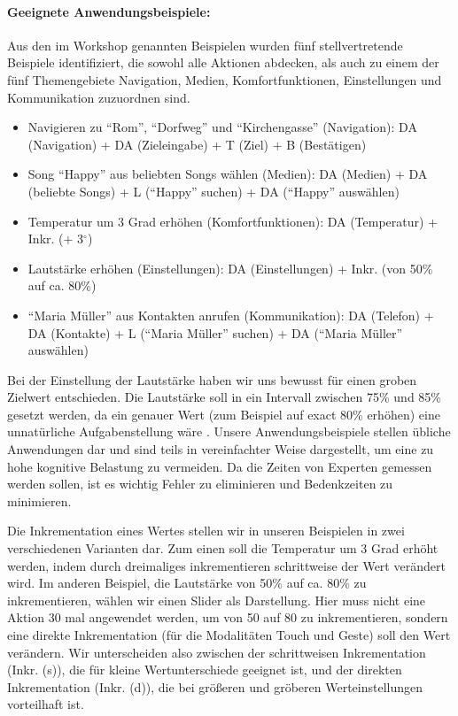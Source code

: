 \paragraph{Geeignete Anwendungsbeispiele:}
Aus den im Workshop genannten Beispielen wurden fünf stellvertretende Beispiele identifiziert, die sowohl alle Aktionen abdecken, als auch zu einem der fünf Themengebiete Navigation, Medien, Komfortfunktionen, Einstellungen und Kommunikation zuzuordnen sind. 
\begin{itemize}
\item Navigieren zu "`Rom"', "`Dorfweg"' und "`Kirchengasse"' (Navigation): DA (Navigation) + DA (Zieleingabe) + T (Ziel) + B (Bestätigen)
\item Song "`Happy"' aus beliebten Songs wählen (Medien): DA (Medien) + DA (beliebte Songs) + L ("`Happy"' suchen) + DA ("`Happy"' auswählen)
\item Temperatur um 3 Grad erhöhen (Komfortfunktionen): DA (Temperatur) + Inkr. (+ 3$^\circ$)
\item Lautstärke erhöhen (Einstellungen): DA (Einstellungen) + Inkr. (von 50\% auf ca. 80\%)
\item "`Maria Müller"' aus Kontakten anrufen (Kommunikation): DA (Telefon) + DA (Kontakte) + L ("`Maria Müller"' suchen) + DA ("`Maria Müller"' auswählen)
\end{itemize}
Bei der Einstellung der Lautstärke haben wir uns bewusst für einen groben Zielwert entschieden.
Die Lautstärke soll in ein Intervall zwischen 75\% und 85\% gesetzt werden, da ein genauer Wert (zum Beispiel auf exact 80\% erhöhen) eine unnatürliche Aufgabenstellung wäre \citep{stracke2014touch}. 
Unsere Anwendungsbeispiele stellen übliche Anwendungen dar und sind teils in vereinfachter Weise dargestellt, um eine zu hohe kognitive Belastung zu vermeiden. 
Da die Zeiten von Experten gemessen werden sollen, ist es wichtig Fehler zu eliminieren und Bedenkzeiten zu minimieren.

Die Inkrementation eines Wertes stellen wir in unseren Beispielen in zwei verschiedenen Varianten dar. 
Zum einen soll die Temperatur um 3 Grad erhöht werden, indem durch dreimaliges inkrementieren schrittweise der Wert verändert wird. 
Im anderen Beispiel, die Lautstärke von 50\% auf ca. 80\% zu inkrementieren, wählen wir einen Slider als Darstellung. 
Hier muss nicht eine Aktion 30 mal angewendet werden, um von 50 auf 80 zu inkrementieren, sondern eine direkte Inkrementation (für die Modalitäten Touch und Geste) soll den Wert verändern. 
Wir unterscheiden also zwischen der schrittweisen Inkrementation (Inkr. (s)), die für kleine Wertunterschiede geeignet ist, und der direkten Inkrementation (Inkr. (d)), die bei größeren und gröberen Werteinstellungen vorteilhaft ist.

